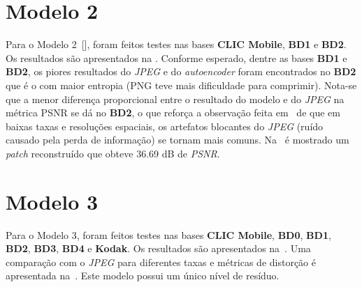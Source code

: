 \section{Modelo 2}
\label{res:mod2}
Para o Modelo 2~[], foram feitos testes nas bases \textbf{\acrshort{CLIC} Mobile}, \textbf{BD1} e \textbf{BD2}. Os resultados são apresentados na . Conforme esperado, dentre as bases \textbf{BD1} e \textbf{BD2}, os piores resultados do \textit{JPEG} e do \textit{autoencoder} foram encontrados no \textbf{BD2} que é o com maior entropia (\acrshort{PNG} teve mais dificuldade para comprimir). Nota-se que a menor diferença proporcional entre o resultado do modelo e do \textit{JPEG} na métrica \acrshort{PSNR} se dá no \textbf{BD2}, o que reforça a observação feita em~\cite{Variable2016Toderici} de que em baixas taxas e resoluções espaciais, os artefatos blocantes do \textit{JPEG} (ruído causado pela perda de informação) se tornam mais comuns. Na~ é mostrado um \textit{patch} reconstruído que obteve 36.69 \acrshort{dB} de \textit{PSNR}.
\section{Modelo 3}
\label{res:mod3}
Para o Modelo 3, foram feitos testes nas bases \textbf{\acrshort{CLIC} Mobile}, \textbf{BD0}, \textbf{BD1}, \textbf{BD2}, \textbf{BD3}, \textbf{BD4} e \textbf{Kodak}. Os resultados são apresentados na~. Uma comparação com o \textit{JPEG} para diferentes taxas e métricas de distorção é apresentada na~. Este modelo possui um único nível de resíduo.

